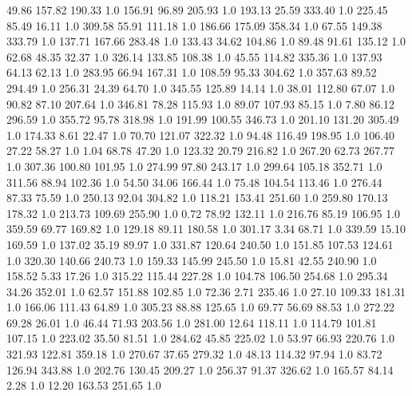    49.86   157.82   190.33  1.0
  156.91    96.89   205.93  1.0
  193.13    25.59   333.40  1.0
  225.45    85.49    16.11  1.0
  309.58    55.91   111.18  1.0
  186.66   175.09   358.34  1.0
   67.55   149.38   333.79  1.0
  137.71   167.66   283.48  1.0
  133.43    34.62   104.86  1.0
   89.48    91.61   135.12  1.0
   62.68    48.35    32.37  1.0
  326.14   133.85   108.38  1.0
   45.55   114.82   335.36  1.0
  137.93    64.13    62.13  1.0
  283.95    66.94   167.31  1.0
  108.59    95.33   304.62  1.0
  357.63    89.52   294.49  1.0
  256.31    24.39    64.70  1.0
  345.55   125.89    14.14  1.0
   38.01   112.80    67.07  1.0
   90.82    87.10   207.64  1.0
  346.81    78.28   115.93  1.0
   89.07   107.93    85.15  1.0
    7.80    86.12   296.59  1.0
  355.72    95.78   318.98  1.0
  191.99   100.55   346.73  1.0
  201.10   131.20   305.49  1.0
  174.33     8.61    22.47  1.0
   70.70   121.07   322.32  1.0
   94.48   116.49   198.95  1.0
  106.40    27.22    58.27  1.0
    1.04    68.78    47.20  1.0
  123.32    20.79   216.82  1.0
  267.20    62.73   267.77  1.0
  307.36   100.80   101.95  1.0
  274.99    97.80   243.17  1.0
  299.64   105.18   352.71  1.0
  311.56    88.94   102.36  1.0
   54.50    34.06   166.44  1.0
   75.48   104.54   113.46  1.0
  276.44    87.33    75.59  1.0
  250.13    92.04   304.82  1.0
  118.21   153.41   251.60  1.0
  259.80   170.13   178.32  1.0
  213.73   109.69   255.90  1.0
    0.72    78.92   132.11  1.0
  216.76    85.19   106.95  1.0
  359.59    69.77   169.82  1.0
  129.18    89.11   180.58  1.0
  301.17     3.34    68.71  1.0
  339.59    15.10   169.59  1.0
  137.02    35.19    89.97  1.0
  331.87   120.64   240.50  1.0
  151.85   107.53   124.61  1.0
  320.30   140.66   240.73  1.0
  159.33   145.99   245.50  1.0
   15.81    42.55   240.90  1.0
  158.52     5.33    17.26  1.0
  315.22   115.44   227.28  1.0
  104.78   106.50   254.68  1.0
  295.34    34.26   352.01  1.0
   62.57   151.88   102.85  1.0
   72.36     2.71   235.46  1.0
   27.10   109.33   181.31  1.0
  166.06   111.43    64.89  1.0
  305.23    88.88   125.65  1.0
   69.77    56.69    88.53  1.0
  272.22    69.28    26.01  1.0
   46.44    71.93   203.56  1.0
  281.00    12.64   118.11  1.0
  114.79   101.81   107.15  1.0
  223.02    35.50    81.51  1.0
  284.62    45.85   225.02  1.0
   53.97    66.93   220.76  1.0
  321.93   122.81   359.18  1.0
  270.67    37.65   279.32  1.0
   48.13   114.32    97.94  1.0
   83.72   126.94   343.88  1.0
  202.76   130.45   209.27  1.0
  256.37    91.37   326.62  1.0
  165.57    84.14     2.28  1.0
   12.20   163.53   251.65  1.0
